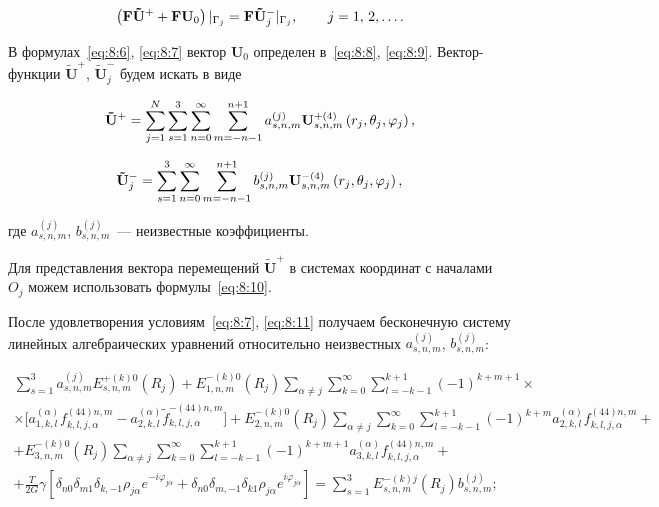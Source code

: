 \begin{equation}
\left( {{\bf{F\tilde U^+}} + {\bf{F}}{{\bf{U}}_0}} \right){|_{{\Gamma _j}}} = {\bf{F}}{{\bf{\tilde U^-}}_j}{|_{{\Gamma _j}}},\qquad {\kern 1pt} j = 1,{\mkern 1mu} {\kern 1pt} 2,\dots.
\label{eq:8:11}
\end{equation}

В формулах~\eqref{eq:8:6}, \eqref{eq:8:7} вектор $\mathbf{U}_0$ определен в~\eqref{eq:8:8}, \eqref{eq:8:9}. Вектор-функции $\mathbf{\tilde U}^+$, $\mathbf{\tilde U}_j^-$ будем искать в виде

\begin{equation}
{{\bf{\tilde U}}^ + } = \mathop \sum \limits_{j = 1}^N \sum\limits_{s = 1}^3 {\sum\limits_{n = 0}^\infty  {\sum\limits_{m =  - n - 1}^{n + 1} {a_{s,n,m}^{(j)}} } } {\bf{U}}_{s,n,m}^{ + (4)}\left( {{r_j},{\theta _j},{\varphi _j}} \right),
\end{equation}

\begin{equation}
{\bf{\tilde U}}_j^ -  = \sum\limits_{s = 1}^3 {\sum\limits_{n = 0}^\infty  {\sum\limits_{m =  - n - 1}^{n + 1} {b_{s,n,m}^{(j)}} } } {\bf{U}}_{s,n,m}^{ - (4)}\left( {{r_j},{\theta _j},{\varphi _j}} \right),
\end{equation}

\noindent где $a_{s,n,m}^{(j)}$, $b_{s,n,m}^{(j)}$~--- неизвестные коэффициенты.

Для представления вектора перемещений $\mathbf{\tilde U}^+$ в системах координат с началами $O_j$ можем использовать формулы~\eqref{eq:8:10}.

После удовлетворения условиям~\eqref{eq:8:7}, \eqref{eq:8:11} получаем бесконечную систему линейных алгебраических уравнений относительно неизвестных $a_{s,n,m}^{(j)}$, $b_{s,n,m}^{(j)}$:

\begin{multline}
\sum\limits_{s = 1}^3 {a_{s,n,m}^{(j)}} E_{s,n,m}^{ + (k)0}({R_j}) + E_{1,n,m}^{ - (k)0}({R_j})\sum\limits_{\alpha  \ne j} \sum\limits_{k = 0}^\infty  {\sum\limits_{l =  - k - 1}^{k + 1} {{{( - 1)}^{k + m + 1}}} }\times \\
\times\bigg[ {a_{1,k,l}^{(\alpha )}f_{k,l,j,\alpha }^{(44)n,m} - }{a_{2,k,l}^{(\alpha )}\tilde f_{k,l,j,\alpha }^{ - (44)n,m}} \bigg] + E_{2,n,m}^{ - (k)0}({R_j})\sum\limits_{\alpha  \ne j} {\sum\limits_{k = 0}^\infty  {\sum\limits_{l =  - k - 1}^{k + 1} {{{( - 1)}^{k + m}}} } a_{2,k,l}^{(\alpha )}f_{k,l,j,\alpha }^{(44)n,m} + } \\
+ E_{3,n,m}^{ - (k)0}({R_j})\sum\limits_{\alpha  \ne j} {\sum\limits_{k = 0}^\infty  {\sum\limits_{l =  - k - 1}^{k + 1} {{{( - 1)}^{k + m + 1}}} } a_{3,k,l}^{(\alpha )}f_{k,l,j,\alpha }^{(44)n,m} + } \\
+ \frac{T}{{2G}}\gamma \left[ {{\delta _{n0}}{\delta _{m1}}{\delta _{k, - 1}}{\rho _{j\alpha }}{e^{ - i{\varphi _{j\alpha }}}} + {\delta _{n0}}{\delta _{m, - 1}}{\delta _{k1}}{\rho _{j\alpha }}{e^{i{\varphi _{j\alpha }}}}} \right] = \sum\limits_{s = 1}^3 {E_{s,n,m}^{ - (k)j}} ({R_j})b_{s,n,m}^{(j)};
\end{multline}


